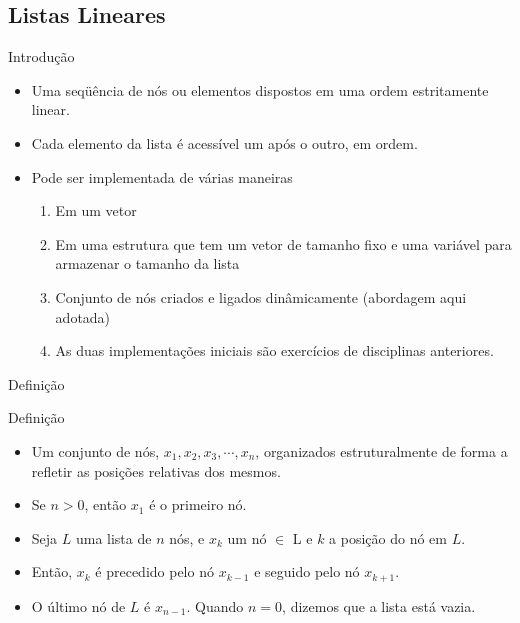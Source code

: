 \subsection{Listas Lineares}
  \begin{frame}{Introdução}    
		\begin{itemize}
			\item Uma seqüência de nós ou elementos dispostos em uma ordem estritamente linear.
			\item Cada elemento da lista é acessível um após o outro, em ordem.
			\item Pode ser implementada de várias maneiras			
				\begin{enumerate}
					\item Em um vetor
					\item Em uma estrutura que tem um vetor de tamanho fixo e uma 
					variável para armazenar o tamanho da lista
					\item Conjunto de nós criados e ligados dinâmicamente (abordagem aqui adotada)
					\pause
					\item As duas implementações iniciais são exercícios de disciplinas anteriores.
				\end{enumerate}
		\end{itemize}
  \end{frame}
\begin{frame}{Definição}
     \begin{block}{Definição}
     \begin{itemize}
       \item Um conjunto de nós, $x_1, x_2, x_3, \cdots, x_n$, organizados estruturalmente de forma a refletir as posições relativas dos mesmos. 
       \item  Se $n > 0$, então $x_1$ é o primeiro nó.
      \item Seja $L$ uma lista de $n$ nós, e $x_k$ um nó $\in$ L e $k$ a posição do nó em $L$. 
      \item  Então, $x_k$ é precedido pelo nó $x_{k-1}$ e seguido pelo nó $x_{k+1}$. 
      \item  O último nó de $L$ é $x_{n-1}$. Quando $n = 0$, dizemos que a lista está vazia.
       \end{itemize}
     \end{block}     
\end{frame}
